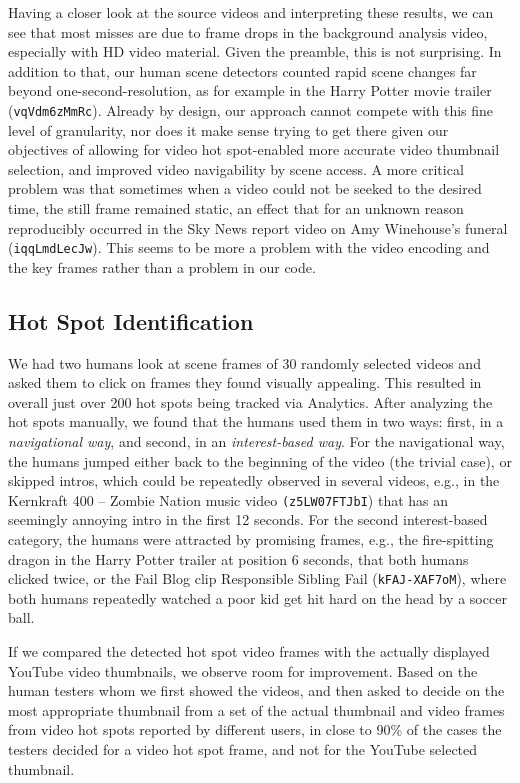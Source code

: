 \documentclass[10pt,twocolumn,letterpaper]{article}
\begin{document}
Having a closer look at the source videos and interpreting these results, we can see that most misses are due to frame drops in the background analysis video, especially with HD video material. Given the preamble, this is not surprising. In addition to that, our human scene detectors counted rapid scene changes far beyond one-second-resolution, as for example in the Harry Potter movie trailer (\texttt{vqVdm6zMmRc}). Already by design, our approach cannot compete with this fine level of granularity, nor does it make sense trying to get there given our objectives of allowing for video hot spot-enabled more accurate video thumbnail selection, and improved video navigability by scene access. A more critical problem was that sometimes when a video could not be seeked to the desired time, the still frame remained static, an effect that for an unknown reason reproducibly occurred in the Sky News report video on Amy Winehouse's funeral (\texttt{iqqLmdLecJw}). This seems to be more a problem with the video encoding and the key frames rather than a problem in our code. 

\subsection{Hot Spot Identification}
We had two humans look at scene frames of 30 randomly selected videos and asked them to click on frames they found visually appealing. This resulted in overall just over 200 hot spots being tracked via Analytics. After analyzing the hot spots manually, we found that the humans used them in two ways: first, in a \emph{navigational way}, and second, in an \emph{interest-based way}. For the navigational way, the humans jumped either back to the beginning of the video (the trivial case), or skipped intros, which could be repeatedly observed in several videos, e.g., in the Kernkraft 400 -- Zombie Nation music video \texttt{(z5LW07FTJbI}) that has an seemingly annoying intro in the first 12 seconds. For the second interest-based category, the humans were attracted by promising frames, e.g., the fire-spitting dragon in the Harry Potter trailer at position 6 seconds, that both humans clicked twice, or the Fail Blog clip Responsible Sibling Fail (\texttt{kFAJ-XAF7oM}), where both humans repeatedly watched a poor kid get hit hard on the head by a soccer ball.

If we compared the detected hot spot video frames with the actually displayed YouTube video thumbnails, we observe room for improvement. Based on the human testers whom we first showed the videos, and then asked to decide on the most appropriate thumbnail from a set of the actual thumbnail and video frames from video hot spots reported by different users, in close to 90\% of the cases the testers decided for a video hot spot frame, and not for the YouTube selected thumbnail. 
\end{document}

